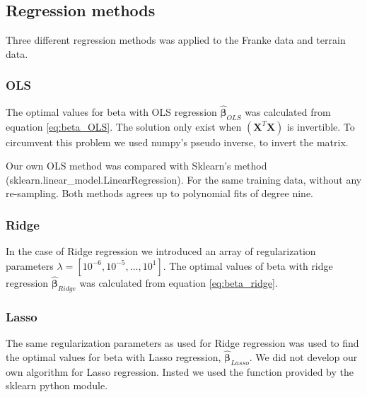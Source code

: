   




\subsection{Regression methods}
Three different regression methods was applied to the Franke data and terrain
data.  
\subsubsection{OLS}
The optimal values for beta with OLS regression $\hat{\bm{\beta}  }_{OLS}$ was
calculated from equation
\eqref{eq:beta_OLS}. The solution only exist when $(\bm{X}^T \bm{X})$ is
invertible. To circumvent this problem we used numpy's pseudo inverse, to invert
the matrix.

Our own OLS method was compared with Sklearn's method
(sklearn.linear\_model.LinearRegression). For the same training data, without
any re-sampling. Both methods agrees up to polynomial fits of degree nine.  

\subsubsection{Ridge}
In the case of Ridge regression we introduced an array of regularization
parameters $\lambda = [10^{-6}, 10^{-5}, \hdots, 10^{1}]$. The optimal values
of beta with ridge regression $\hat{\bm{\beta } } _{Ridge} $ was calculated
from equation \eqref{eq:beta_ridge}. 

\subsubsection{Lasso}
The same regularization parameters as used for Ridge regression was used to find the
optimal values for beta with Lasso regression, $\hat{\bm{\beta } } _{Lasso} $. We did not develop our
own algorithm for Lasso regression. Insted we used the function provided by the
sklearn python module.  

